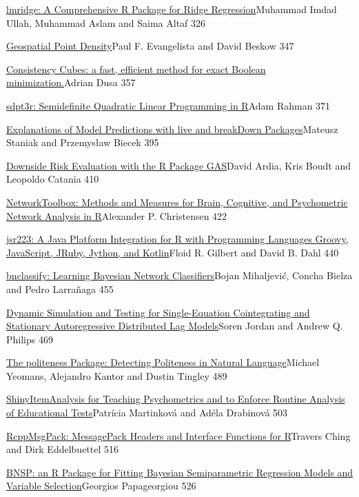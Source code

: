 \href{../../articles/RJ-2018-060}{lmridge: A Comprehensive R Package for
Ridge Regression}Muhammad Imdad Ullah, Muhammad Aslam and Saima Altaf
326

\href{../../articles/RJ-2018-061}{Geospatial Point Density}Paul F.
Evangelista and David Beskow 347

\href{../../articles/RJ-2018-080}{Consistency Cubes: a fast, efficient
method for exact Boolean minimization.}Adrian Dusa 357

\href{../../articles/RJ-2018-063}{sdpt3r: Semidefinite Quadratic Linear
Programming in R}Adam Rahman 371

\href{../../articles/RJ-2018-072}{Explanations of Model Predictions with
live and breakDown Packages}Mateusz Staniak and Przemysław Biecek 395

\href{../../articles/RJ-2018-064}{Downside Risk Evaluation with the R
Package GAS}David Ardia, Kris Boudt and Leopoldo Catania 410

\href{../../articles/RJ-2018-065}{NetworkToolbox: Methods and Measures
for Brain, Cognitive, and Psychometric Network Analysis in R}Alexander
P. Christensen 422

\href{../../articles/RJ-2018-066}{jsr223: A Java Platform Integration
for R with Programming Languages Groovy, JavaScript, JRuby, Jython, and
Kotlin}Floid R. Gilbert and David B. Dahl 440

\href{../../articles/RJ-2018-073}{bnclassify: Learning Bayesian Network
Classifiers}Bojan Mihaljević, Concha Bielza and Pedro Larrañaga 455

\href{../../articles/RJ-2018-076}{Dynamic Simulation and Testing for
Single-Equation Cointegrating and Stationary Autoregressive Distributed
Lag Models}Soren Jordan and Andrew Q. Philips 469

\href{../../articles/RJ-2018-079}{The politeness Package: Detecting
Politeness in Natural Language}Michael Yeomans, Alejandro Kantor and
Dustin Tingley 489

\href{../../articles/RJ-2018-074}{ShinyItemAnalysis for Teaching
Psychometrics and to Enforce Routine Analysis of Educational
Tests}Patrícia Martinková and Adéla Drabinová 503

\href{../../articles/RJ-2018-068}{RcppMsgPack: MessagePack Headers and
Interface Functions for R}Travers Ching and Dirk Eddelbuettel 516

\href{../../articles/RJ-2018-069}{BNSP: an R Package for Fitting
Bayesian Semiparametric Regression Models and Variable
Selection}Georgios Papageorgiou 526

